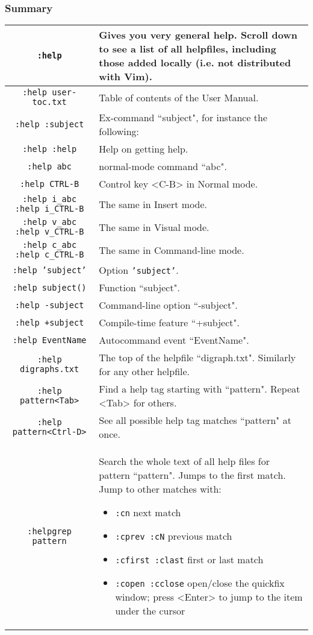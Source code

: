 \subsubsection{Summary}
\label{help-summary}
\begin{tabularx}{\textwidth}{|c | X|}
				\hline
				\texttt{:help} &
				Gives you very general help.
				Scroll down to see a list of all helpfiles, including those added locally (i.e. not distributed with Vim). \\ \hline
				\texttt{:help user-toc.txt} & Table of contents of the User Manual.\\ \hline
				\texttt{:help :subject} & Ex-command ``subject", for instance the following:\\ \hline
				\texttt{:help :help} & Help on getting help.\\ \hline
				\texttt{:help abc} & normal-mode command ``abc".\\ \hline
				\texttt{:help CTRL-B} & Control key <C-B> in Normal mode.\\ \hline
				\texttt{:help i\_abc}  \texttt{:help i\_CTRL-B} & The same in Insert mode. \\ \hline
				\texttt{:help v\_abc}  \texttt{:help v\_CTRL-B} & The same in Visual mode. \\ \hline
				\texttt{:help c\_abc}  \texttt{:help c\_CTRL-B} & The same in Command-line mode. \\ \hline
				\texttt{:help 'subject'} & Option \texttt{'subject'}.\\ \hline
				\texttt{:help subject()} & Function ``subject".\\ \hline
				\texttt{:help -subject} & Command-line option ``-subject".\\ \hline
				\texttt{:help +subject} & Compile-time feature ``+subject".\\ \hline
				\texttt{:help EventName} & Autocommand event ``EventName".\\ \hline
				\texttt{:help digraphs.txt} & The top of the helpfile ``digraph.txt". Similarly for any other helpfile.\\ \hline
				\texttt{:help pattern<Tab>} & Find a help tag starting with ``pattern". Repeat <Tab> for others.\\ \hline
				\texttt{:help pattern<Ctrl-D>} & See all possible help tag matches ``pattern" at once.\\ \hline
				\texttt{:helpgrep pattern} & Search the whole text of all help files for pattern ``pattern".  Jumps to the first match.
				Jump to other matches with:
				\begin{itemize}
								\item \texttt{:cn} next match
								\item \texttt{:cprev :cN} previous match
								\item \texttt{:cfirst :clast} first or last match
								\item \texttt{:copen :cclose} open/close the quickfix window; press <Enter> to jump to the item under the cursor
				\end{itemize}
				\\ \hline
\end{tabularx}
\clearpage
